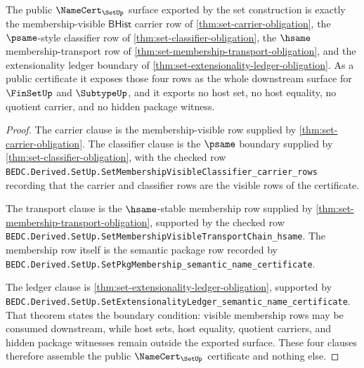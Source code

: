 \begin{theorem}
\label{thm:set-public-namecert-export}
The public $\NameCert_{\SetUp}$ surface exported by the set construction is exactly the membership-visible $\mathsf{BHist}$ carrier row of \autoref{thm:set-carrier-obligation}, the $\psame$-style classifier row of \autoref{thm:set-classifier-obligation}, the $\hsame$ membership-transport row of \autoref{thm:set-membership-transport-obligation}, and the extensionality ledger boundary of \autoref{thm:set-extensionality-ledger-obligation}. As a public certificate it exposes those four rows as the whole downstream surface for $\FinSetUp$ and $\SubtypeUp$, and it exports no host set, no host equality, no quotient carrier, and no hidden package witness.
\end{theorem}
\begin{proof}
The carrier clause is the membership-visible row supplied by \autoref{thm:set-carrier-obligation}. The classifier clause is the $\psame$ boundary supplied by \autoref{thm:set-classifier-obligation}, with the checked row \texttt{BEDC.Derived.SetUp.SetMembershipVisibleClassifier\_carrier\_rows} recording that the carrier and classifier rows are the visible rows of the certificate.

The transport clause is the $\hsame$-stable membership row supplied by \autoref{thm:set-membership-transport-obligation}, supported by the checked row \texttt{BEDC.Derived.SetUp.SetMembershipVisibleTransportChain\_hsame}. The membership row itself is the semantic package row recorded by \texttt{BEDC.Derived.SetUp.SetPkgMembership\_semantic\_name\_certificate}.

The ledger clause is \autoref{thm:set-extensionality-ledger-obligation}, supported by \texttt{BEDC.Derived.SetUp.SetExtensionalityLedger\_semantic\_name\_certificate}. That theorem states the boundary condition: visible membership rows may be consumed downstream, while host sets, host equality, quotient carriers, and hidden package witnesses remain outside the exported surface. These four clauses therefore assemble the public $\NameCert_{\SetUp}$ certificate and nothing else.
\end{proof}

